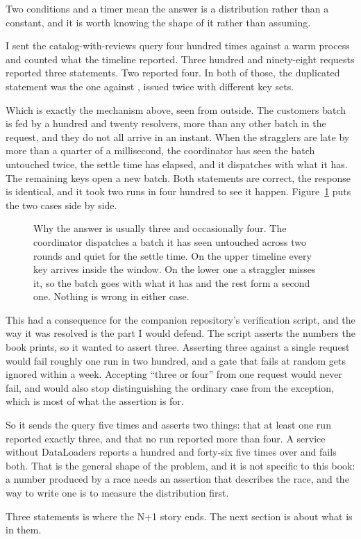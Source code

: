 %
Two conditions and a timer mean the answer is a distribution rather than a
constant, and it is worth knowing the shape of it rather than assuming.

I sent the catalog-with-reviews query four hundred times against a warm process
and counted what the timeline reported. Three hundred and ninety-eight requests
reported three statements. Two reported four. In both of those, the duplicated
statement was the one against , issued twice with different key
sets.

%
Which is exactly the mechanism above, seen from outside. The customers batch is
fed by a hundred and twenty resolvers, more than any other batch in the request,
and they do not all arrive in an instant. When the stragglers are late by more
than a quarter of a millisecond, the coordinator has seen the batch untouched
twice, the settle time has elapsed, and it dispatches with what it has. The
remaining keys open a new batch. Both statements are correct, the response is
identical, and it took two runs in four hundred to see it happen.
Figure~\ref{fig:ch04-batch-window} puts the two cases side by side.

\begin{figure}[htbp]
  \centering
  
  \caption{Why the answer is usually three and occasionally four. The
  coordinator dispatches a batch it has seen untouched across two rounds and
  quiet for the settle time. On the upper timeline every key arrives inside the
  window. On the lower one a straggler misses it, so the batch goes with what it
  has and the rest form a second one. Nothing is wrong in either case.}
  \label{fig:ch04-batch-window}
\end{figure}

This had a consequence for the companion repository's verification script, and
the way it was resolved is the part I would defend. The script asserts the
numbers the book prints, so it wanted to assert three. Asserting three against a
single request would fail roughly one run in two hundred, and a gate that fails
at random gets ignored within a week. Accepting \enquote{three or four} from one
request would never fail, and would also stop distinguishing the ordinary case
from the exception, which is most of what the assertion is for.

So it sends the query five times and asserts two things: that at least one run
reported exactly three, and that no run reported more than four. A service
without DataLoaders reports a hundred and forty-six five times over and fails
both. That is the general shape of the problem, and it is not specific to this
book: a number produced by a race needs an assertion that describes the race,
and the way to write one is to measure the distribution first.

Three statements is where the N+1 story ends. The next section is about what is
in them.
